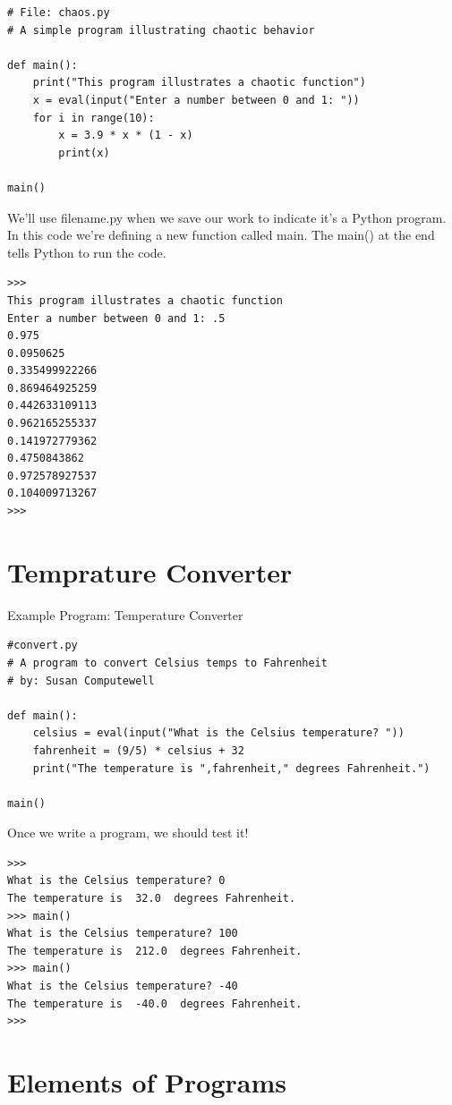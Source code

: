 \documentclass[12pt,a4paper,final,twoside,titlepage]{book}
\begin{document}
\lstset{language=Python, tabsize=4}
\begin{lstlisting}
# File: chaos.py
# A simple program illustrating chaotic behavior

def main():
    print("This program illustrates a chaotic function")
    x = eval(input("Enter a number between 0 and 1: "))
    for i in range(10):
        x = 3.9 * x * (1 - x)
        print(x)

main()
\end{lstlisting}
We’ll use filename.py when we save our work to indicate it’s a Python program. In this code we’re defining a new function called main. The main() at the end tells Python to run the code.
\lstset{language=Python, tabsize=4}
\begin{lstlisting}
>>> 
This program illustrates a chaotic function
Enter a number between 0 and 1: .5
0.975
0.0950625
0.335499922266
0.869464925259
0.442633109113
0.962165255337
0.141972779362
0.4750843862
0.972578927537
0.104009713267
>>> 
\end{lstlisting}
\section{Temprature Converter}
Example Program: Temperature Converter
\lstset{language=Python, tabsize=4}
\begin{lstlisting}
#convert.py
# A program to convert Celsius temps to Fahrenheit
# by: Susan Computewell

def main():
    celsius = eval(input("What is the Celsius temperature? "))
    fahrenheit = (9/5) * celsius + 32
    print("The temperature is ",fahrenheit," degrees Fahrenheit.")

main()
\end{lstlisting}
Once we write a program, we should test it!
\lstset{language=Python, tabsize=4}
\begin{lstlisting}
>>> 
What is the Celsius temperature? 0
The temperature is  32.0  degrees Fahrenheit.
>>> main()
What is the Celsius temperature? 100
The temperature is  212.0  degrees Fahrenheit.
>>> main()
What is the Celsius temperature? -40
The temperature is  -40.0  degrees Fahrenheit.
>>> 
\end{lstlisting}
\section{Elements of Programs}
\end{document}

